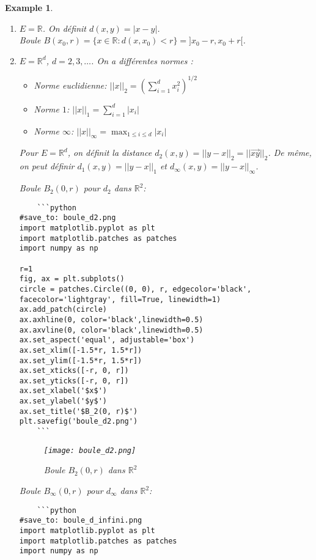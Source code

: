 \documentclass{article}
\newtheorem{example}{Example}
\begin{document}
\begin{example}
\begin{enumerate}
    \item $E = \mathbb{R}$. On définit $d(x, y) = |x - y|$. \\
    Boule $B(x_0, r) = \{x \in \mathbb{R} : d(x, x_0) < r \} = ]x_0 - r, x_0 + r[$.

    \item $E = \mathbb{R}^d$, $d = 2, 3, \dots$. On a différentes normes :
    \begin{itemize}
        \item Norme euclidienne: $||x||_2 = (\sum_{i=1}^d x_i^2)^{1/2}$
        \item Norme $1$: $||x||_1 = \sum_{i=1}^d |x_i|$
        \item Norme $\infty$: $||x||_\infty = \max_{1 \leq i \leq d} |x_i|$
    \end{itemize}
    Pour $E = \mathbb{R}^d$, on définit la distance $d_2(x, y) = ||y - x||_2 = ||\overrightarrow{xy}||_2$. De même, on peut définir $d_1(x, y) = ||y - x||_1$ et $d_\infty(x, y) = ||y - x||_\infty$.

    Boule $B_2(0, r)$ pour $d_2$ dans $\mathbb{R}^2$:

    \begin{verbatim}
    ```python
#save_to: boule_d2.png
import matplotlib.pyplot as plt
import matplotlib.patches as patches
import numpy as np

r=1
fig, ax = plt.subplots()
circle = patches.Circle((0, 0), r, edgecolor='black', facecolor='lightgray', fill=True, linewidth=1)
ax.add_patch(circle)
ax.axhline(0, color='black',linewidth=0.5)
ax.axvline(0, color='black',linewidth=0.5)
ax.set_aspect('equal', adjustable='box')
ax.set_xlim([-1.5*r, 1.5*r])
ax.set_ylim([-1.5*r, 1.5*r])
ax.set_xticks([-r, 0, r])
ax.set_yticks([-r, 0, r])
ax.set_xlabel('$x$')
ax.set_ylabel('$y$')
ax.set_title('$B_2(0, r)$')
plt.savefig('boule_d2.png')
    ```
    \end{verbatim}

    \begin{figure}[H]
        \centering
        \texttt{[image: boule\_d2.png]}
        \caption{Boule $B_2(0, r)$ dans $\mathbb{R}^2$}
        \label{fig:boule_d2}
    \end{figure}

    Boule $B_\infty(0, r)$ pour $d_\infty$ dans $\mathbb{R}^2$:

    \begin{verbatim}
    ```python
#save_to: boule_d_infini.png
import matplotlib.pyplot as plt
import matplotlib.patches as patches
import numpy as np


\end{verbatim}
\end{enumerate}
\end{example}
\end{document}

